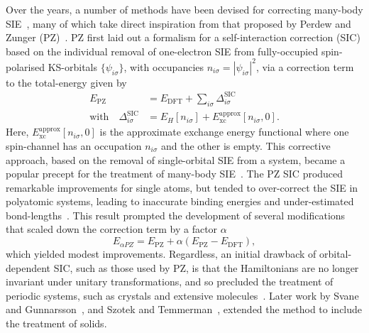 {Over the years, 
a number of methods have been devised 
for correcting many-body SIE~\cite{doi:10.1021/ja8087482,
doi:10.1063/1.3269030,
doi:10.1063/1.3269029,
PhysRevLett.100.146401,
RevModPhys.80.3,
doi:10.1021/ct8005419,
PhysRevB.67.125109,
PhysRevB.71.035105,
PhysRevB.71.205210,
doi:10.1063/1.2387954,
0953-8984-19-10-106206,
PhysRevB.78.125116,
PhysRevB.77.155106,
doi:10.1063/1.452616,
PhysRevB.82.115121}, 
many of which take direct inspiration 
from that proposed by Perdew and Zunger 
(PZ)~\cite{PhysRevB.23.5048}.
%
PZ first laid out a {formalism for} a 
self-interaction correction (SIC) 
based on the individual removal of 
one-electron SIE 
from fully-occupied spin-polarised 
KS-orbitals 
$\{\psi_{i\sigma}\}$, 
with occupancies 
$n_{i\sigma}=\left|\psi_{i\sigma}\right|^2$, 
via a correction term to the total-energy 
given by
%
\begin{align}
E_\textrm{PZ}&=E_\textrm{DFT}+\sum_{i\sigma}\Delta_{i\sigma}^\textrm{SIC} \nonumber\\[0.5em]
\mbox{with}\quad
\Delta_{i\sigma}^\textrm{SIC}
&=E_H[n_{i\sigma}]+E_\textrm{xc}^\textrm{approx}[n_{i\sigma},0].
\end{align}
%
{Here, $E_\textrm{xc}^\textrm{approx}[n_{i\sigma},0]$ 
is the approximate exchange energy functional 
where one spin-channel 
has an occupation $n_{i\sigma}$ 
and the other is empty.}
%
This corrective approach, 
based on the removal of 
single-orbital SIE from a system, 
became a popular precept for 
the treatment of many-body SIE~\cite{doi:10.1063/1.2204599,doi:10.1063/1.2176608}.
%
The PZ SIC 
produced remarkable 
improvements for single atoms, 
but tended to over-correct the SIE 
in polyatomic systems, 
leading to inaccurate binding energies 
and under-estimated bond-lengths~\cite{PhysRevA.55.1765,PhysRevB.82.115121,doi:10.1021/cr200107z}.
%
This result prompted   
the development of several modifications~\cite{doi:10.1063/1.2387954,doi:10.1063/1.2176608,doi:10.1063/1.2204599,doi:10.1063/1.2566637} 
that scaled down the correction term 
by a factor $\alpha$
%
\begin{equation}
E_{\alpha PZ}=E_\textrm{PZ}+\alpha\left(E_\textrm{PZ}-E_\textrm{DFT}\right), 
\end{equation}
%
which yielded modest improvements.
%
Regardless, 
{an initial} drawback 
of orbital-dependent SIC, 
such as those used by PZ, 
is that the Hamiltonians are no longer invariant 
under unitary transformations, 
and so precluded 
the treatment of periodic systems,
such as crystals and extensive molecules~\cite{RevModPhys.80.3}.
%
{
Later work by 
Svane and Gunnarsson~\cite{PhysRevB.37.9919,0295-5075-7-2-013,PhysRevLett.65.1148,PhysRevLett.68.1900}, 
and Szotek and Temmerman~\cite{PhysRevB.47.4029,SZOTEK199119,PhysRevB.47.11533,PhysRevB.52.R14316,PhysRevLett.79.3970,PhysRevB.71.205109}, 
extended the method to include the treatment of solids.}


}
